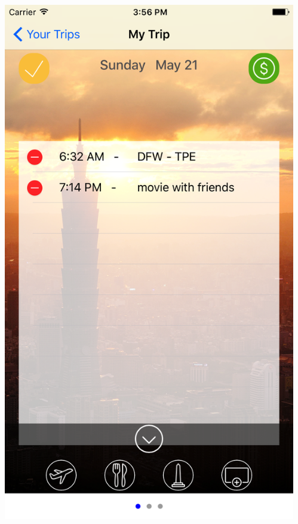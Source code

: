 \documentclass{beamer}
\begin{document}
\begin{frame}
\begin{columns}
\begin{column}{0.3\textwidth}
\begin{center}
        \end{center}
    \end{column}
    \begin{column}{0.3\textwidth}  %
        \begin{center}
            \includegraphics[scale=0.08]{itinerary2}
        \end{center}
    \end{column}
\end{columns}
\end{frame}
\end{document}
